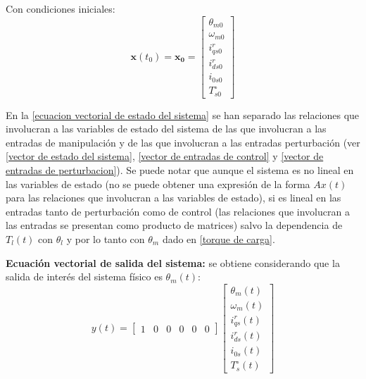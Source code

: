 \documentclass[a4paper, 10pt, onecolumn,journal]{ieeeconf}
\begin{document}
Con condiciones iniciales:
\begin{equation}
    \mathbf{x}(t_0) = \mathbf{x_0}
    =
    \begin{bmatrix} 
        \theta_{m0} \\ 
        \omega_{m0} \\ 
        i^r_{qs0} \\ 
        i^r_{ds0} \\ 
        i_{0s0} \\ 
        T^\circ_{s0} 
    \end{bmatrix}
\end{equation}

En la \cref{ecuacion vectorial de estado del sistema} se han separado
las relaciones que involucran a las variables de estado del sistema de las que involucran a las 
entradas de manipulación y de las que involucran a las entradas perturbación (ver \cref{vector de estado del sistema}, \cref{vector de entradas de control} y \cref{vector de entradas de perturbacion}). Se puede notar
que aunque el sistema es no lineal en las variables de estado (no se puede obtener una expresión de la forma $Ax(t)$ para las relaciones que involucran a las variables de estado), 
si es lineal en las entradas tanto de perturbación como de control (las relaciones que involucran a las entradas se presentan como producto de matrices) salvo la dependencia de $T_l(t)$ con $\theta_l$ y por lo tanto con $\theta_m$ 
dado en \cref{torque de carga}.

\textbf{Ecuación vectorial de salida del sistema:} se obtiene considerando que la salida de interés del sistema físico es $\theta_m(t)$:
\begin{equation}
    y(t) = 
    \begin{bmatrix}
        1 & 0 & 0 & 0 & 0 & 0
    \end{bmatrix}
    \begin{bmatrix} \theta_m(t) \\ \omega_m(t) \\ i^r_{qs}(t) \\ i^r_{ds}(t) \\ i_{0s}(t) \\ T^\circ_s(t) \end{bmatrix}
    \label{ecuacion vectorial de salida del sistema}
\end{equation}
\end{document}
